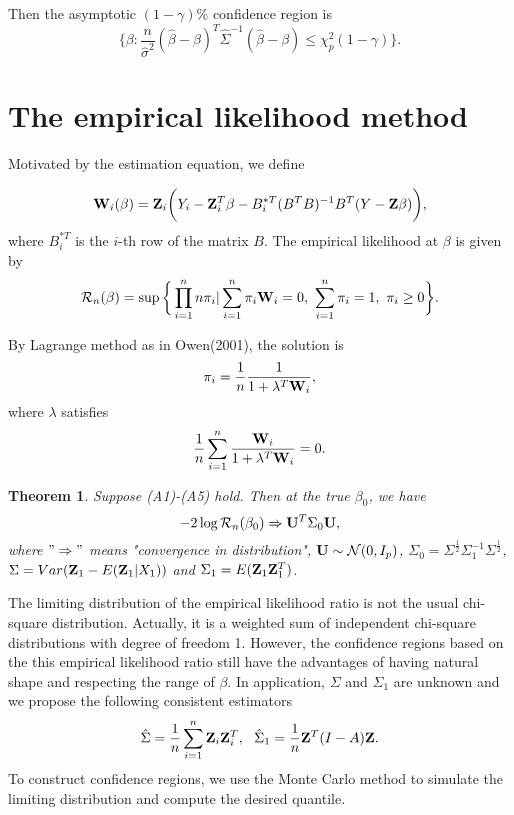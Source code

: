 \documentclass[preprint,12pt]{elsarticle}
\newtheorem{theorem}{Theorem}
\begin{document}
	Then the asymptotic $(1-\gamma)\%$ confidence region is
	\[\bigg\{\beta:\frac{n}{\hat{\sigma}^2}(\hat{\beta}-\beta)^T\hat{\Sigma}^{-1}(\hat{\beta}-\beta)\leq \chi^2_p(1-\gamma)\bigg\}.\]



	\section{The empirical likelihood method}



	Motivated by the estimation equation, we define
	
	\[{\bf W}_i(\beta)={\bf Z}_i\bigg (Y_i-{\bf Z}_i^T\beta-B_i^{*T}(B^TB)^{-1}B^T(Y-{\bf Z}\beta)\bigg ),\]
	where $B_i^{*T}$ is the $i$-th row of the matrix $B$. The empirical likelihood at $\beta$ is given by
	\[\mathcal{R}_n(\beta)=\sup\bigg\{\prod_{i=1}^nn\pi_i|\sum_{i=1}^n\pi_i{\bf W}_i=0,\ \sum_{i=1}^n\pi_i=1,\ \pi_i\geq0\bigg\}.\]
	
	By Lagrange method as in Owen(2001), the solution is
	\[\pi_i=\frac{1}{n}\frac{1}{1+\lambda^T{\bf W}_i},\]
	where $\lambda$ satisfies
	\begin{equation}\label{sol}
	\frac{1}{n}\sum_{i=1}^n\frac{{\bf W}_i}{1+\lambda^T{\bf W}_i}=0.
	\end{equation}




	\begin{theorem}
	Suppose (A1)-(A5) hold. Then at the true $\beta_0$, we have
		\[-2\log\mathcal{R}_n(\beta_0)\Rightarrow {\bf U}^T\Sigma_0{\bf U},\]
	where $"\Rightarrow"$ means "convergence in distribution", ${\bf U}\sim\mathcal{N}(0,I_p)$, $\Sigma_0=\Sigma^{\frac{1}{2}}\Sigma_1^{-1}\Sigma^{\frac{1}{2}}$, $\Sigma=Var({\bf Z}_1-E({\bf Z}_1|X_1))$ and $\Sigma_1=E({\bf Z}_1{\bf Z}_1^T)$.
	\end{theorem}
	The limiting distribution of the empirical likelihood ratio is not the usual chi-square distribution. Actually, it is a weighted sum of independent chi-square distributions with degree of freedom 1. However, the confidence
	regions based on the this empirical likelihood ratio still have the advantages of
   having natural shape
	and respecting the range of $\beta$. In application, $\Sigma$ and $\Sigma_1$ are unknown and we propose the following consistent estimators
	\begin{equation}\label{vest}
	\hat{\Sigma}=\frac{1}{n}\sum_{i=1}^n{\bf Z}_i{\bf Z}_i^T,\ \ \hat{\Sigma}_1=\frac{1}{n}{\bf Z}^T(I-A){\bf Z}.
	\end{equation}
	To construct confidence regions, we use the Monte Carlo method to simulate the limiting distribution and compute the desired quantile.
	
\end{document}
